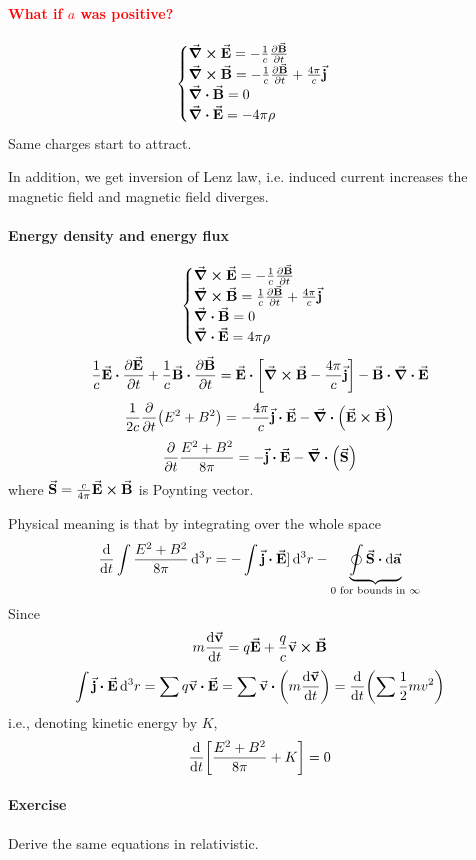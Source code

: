 \paragraph{\textcolor{red}{What if $a$ was positive?}}

$$\begin{cases}
\curl{\va{E}} = - \frac{1}{c} \pdv{\va{B}}{t}\\
\curl{\va{B}} =  -\frac{1}{c} \pdv{\va{B}}{t} + \frac{4\pi}{c} \va{j}\\
\div{\va{B}}=0\\
\div{\va{E}} = -4\pi \rho
\end{cases}$$
Same charges start to attract.

In addition, we get inversion of Lenz law, i.e. induced current increases the magnetic field and magnetic field diverges.
\paragraph{Energy density and energy flux}
$$\begin{cases}
\curl{\va{E}} = - \frac{1}{c} \pdv{\va{B}}{t}\\
\curl{\va{B}} =  \frac{1}{c} \pdv{\va{B}}{t} + \frac{4\pi}{c} \va{j}\\
\div{\va{B}}=0\\
\div{\va{E}} = 4\pi \rho
\end{cases}$$
$$\frac{1}{c} \va{E} \vdot \pdv{\va{E}}{t} + \frac{1}{c} \va{B}\vdot \pdv{\va{B}}{t} = \va{E} \vdot \qty[\curl{\va{B}} - \frac{4\pi}{c} \va{j}] - \va{B} \vdot \div{\va{E}} $$
$$\frac{1}{2c} \pdv{t} \qty( E^2+B^2) = - \frac{4\pi}{c} \va{j} \vdot \va{E}  - \div(\va{E} \cross \va{B})$$
$$ \pdv{t} \frac{E^2+B^2}{8\pi} = - \va{j} \vdot \va{E}  - \div(\va{S})$$
where $\va{S} = \frac{c}{4\pi} \va{E} \cross \va{B}$ is Poynting vector.

Physical meaning is that by integrating over the whole space
$$\dv{t} \int \frac{E^2+B^2}{8\pi} \dd[3]{r}= - \int \va{j} \vdot \va{E}] \dd[3]{r} - \underbrace{\oint \va{S} \vdot \dd{\va{a}}}_{0 \text{ for bounds in } \infty}$$
Since
$$m\dv{\va{v}}{t} = q\va{E} + \frac{q}{c} \va{v} \cross \va{B}$$
$$ \int \va{j} \vdot \va{E} \dd[3]{r} = \sum q \va{v} \vdot \va{E} = \sum \va{v} \vdot \qty(m \dv{\va{v}}{t}) = \dv{t} (\sum \frac{1}{2} m v^2)$$
i.e., denoting kinetic energy by $K$,
$$\dv{t} \qty[\frac{E^2+B^2}{8\pi}  + K] = 0$$

\paragraph{Exercise} Derive the same equations in relativistic.

